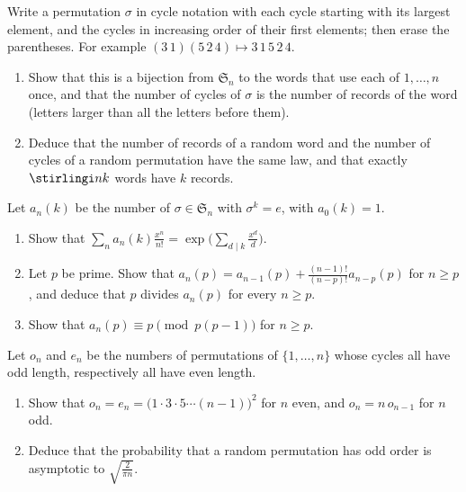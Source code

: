 \begin{exercise}[$\star$]\label{pb:foata}
Write a permutation $\sigma$ in cycle notation with each cycle starting with its largest element, and the cycles in increasing
order of their first elements; then erase the parentheses. For example $(3\,1)(5\,2\,4)\mapsto3\,1\,5\,2\,4$.
\begin{enumerate}[label=(\alph*)]
\item Show that this is a bijection from $\mathfrak S_n$ to the words that use each of $1,\dots,n$ once, and that the number of
cycles of $\sigma$ is the number of records of the word (letters larger than all the letters before them).
\item Deduce that the number of records of a random word and the number of cycles of a random permutation have the same
law, and that exactly $\stirlingi nk$ words have $k$ records.
\end{enumerate}
\end{exercise}

\begin{exercise}[$\star\star$]\label{pb:roots}
Let $a_n(k)$ be the number of $\sigma\in\mathfrak S_n$ with $\sigma^k=e$, with $a_0(k)=1$.
\begin{enumerate}[label=(\alph*)]
\item Show that $\sum_na_n(k)\frac{x^n}{n!}=\exp\bigl(\sum_{d\mid k}\frac{x^d}d\bigr)$.
\item Let $p$ be prime. Show that $a_n(p)=a_{n-1}(p)+\frac{(n-1)!}{(n-p)!}a_{n-p}(p)$ for $n\ge p$, and deduce that $p$ divides
$a_n(p)$ for every $n\ge p$.
\item Show that $a_n(p)\equiv p\pmod{p(p-1)}$ for $n\ge p$.
\end{enumerate}
\end{exercise}

\begin{exercise}[$\star\star$]\label{pb:oddcycles}
Let $o_n$ and $e_n$ be the numbers of permutations of $\{1,\dots,n\}$ whose cycles all have odd length, respectively all have
even length.
\begin{enumerate}[label=(\alph*)]
\item Show that $o_n=e_n=\bigl(1\cdot3\cdot5\cdots(n-1)\bigr)^2$ for $n$ even, and $o_n=n\,o_{n-1}$ for $n$ odd.
\item Deduce that the probability that a random permutation has odd order is asymptotic to $\sqrt{\frac2{\pi n}}$.
\end{enumerate}
\end{exercise}

